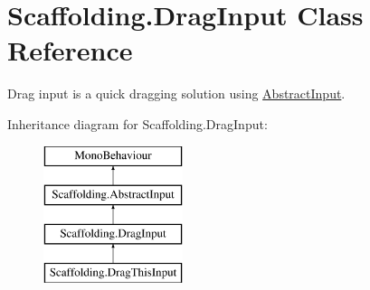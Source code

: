 \hypertarget{class_scaffolding_1_1_drag_input}{\section{Scaffolding.\-Drag\-Input Class Reference}
\label{class_scaffolding_1_1_drag_input}
}


Drag input is a quick dragging solution using \hyperlink{class_scaffolding_1_1_abstract_input}{Abstract\-Input}.  


Inheritance diagram for Scaffolding.\-Drag\-Input\-:\begin{figure}[H]
\begin{center}
\leavevmode
\includegraphics[height=4.000000cm]{class_scaffolding_1_1_drag_input}
\end{center}
\end{figure}
